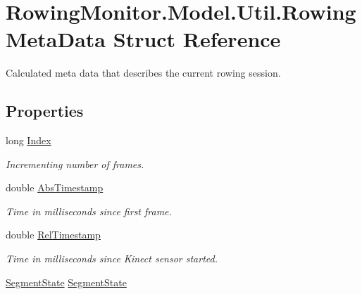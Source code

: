 \hypertarget{struct_rowing_monitor_1_1_model_1_1_util_1_1_rowing_meta_data}{}\section{Rowing\+Monitor.\+Model.\+Util.\+Rowing\+Meta\+Data Struct Reference}
\label{struct_rowing_monitor_1_1_model_1_1_util_1_1_rowing_meta_data}


Calculated meta data that describes the current rowing session.  


\subsection*{Properties}
\begin{DoxyCompactItemize}
\item 
long \hyperlink{struct_rowing_monitor_1_1_model_1_1_util_1_1_rowing_meta_data_ab7ef075ce0af5f7b3e021608f8d6cfa1}{Index}
\begin{DoxyCompactList}\small\item\em Incrementing number of frames. \end{DoxyCompactList}\item 
double \hyperlink{struct_rowing_monitor_1_1_model_1_1_util_1_1_rowing_meta_data_aba87a074cf6175de532c7811b0eac220}{Abs\+Timestamp}
\begin{DoxyCompactList}\small\item\em Time in milliseconds since first frame. \end{DoxyCompactList}\item 
double \hyperlink{struct_rowing_monitor_1_1_model_1_1_util_1_1_rowing_meta_data_a15a8820504d40faccd35d33d54fd90a9}{Rel\+Timestamp}
\begin{DoxyCompactList}\small\item\em Time in milliseconds since Kinect sensor started. \end{DoxyCompactList}\item 
\hyperlink{namespace_rowing_monitor_1_1_model_1_1_util_aab07192bda8b488e80710841de62e4df}{Segment\+State} \hyperlink{struct_rowing_monitor_1_1_model_1_1_util_1_1_rowing_meta_data_a0aa65f7e48c8f87b9d19872521d10412}{Segment\+State}

\end{DoxyCompactItemize}
